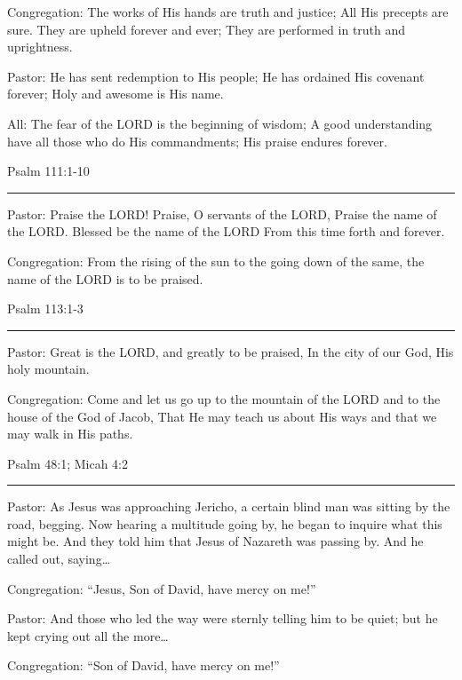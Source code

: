 \documentclass[]{book}
\begin{document}
Congregation: The works of His hands are truth and justice; All His
precepts are sure. They are upheld forever and ever; They are performed
in truth and uprightness.

Pastor: He has sent redemption to His people; He has ordained His
covenant forever; Holy and awesome is His name.

All: The fear of the LORD is the beginning of wisdom; A good
understanding have all those who do His commandments; His praise endures
forever.

Psalm 111:1-10 \textbar{}

\begin{center}\rule{0.5\linewidth}{\linethickness}\end{center}

Pastor: Praise the LORD! Praise, O servants of the LORD, Praise the name
of the LORD. Blessed be the name of the LORD From this time forth and
forever.

Congregation: From the rising of the sun to the going down of the same,
the name of the LORD is to be praised.

Psalm 113:1-3 \textbar{}

\begin{center}\rule{0.5\linewidth}{\linethickness}\end{center}

Pastor: Great is the LORD, and greatly to be praised, In the city of our
God, His holy mountain.

Congregation: Come and let us go up to the mountain of the LORD and to
the house of the God of Jacob, That He may teach us about His ways and
that we may walk in His paths.

Psalm 48:1; Micah 4:2 \textbar{}

\begin{center}\rule{0.5\linewidth}{\linethickness}\end{center}

Pastor: As Jesus was approaching Jericho, a certain blind man was
sitting by the road, begging. Now hearing a multitude going by, he began
to inquire what this might be. And they told him that Jesus of Nazareth
was passing by. And he called out, saying\ldots{}

Congregation: ``Jesus, Son of David, have mercy on me!''

Pastor: And those who led the way were sternly telling him to be quiet;
but he kept crying out all the more\ldots{}

Congregation: ``Son of David, have mercy on me!''
\end{document}
